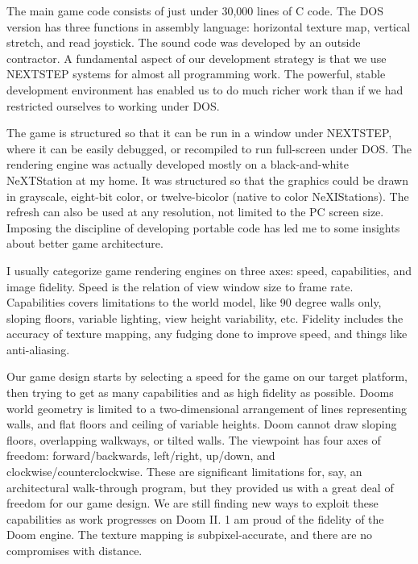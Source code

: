 The main game code consists of
just under 30,000
lines of C code. The
DOS version has three functions in assembly language: horizontal texture map, vertical stretch, and read
joystick. The sound code was developed by an outside contractor. A fundamental aspect of our development
strategy is that we use NEXTSTEP systems
for almost all programming
work. The powerful, stable development environment has enabled us to
do much richer work than if we had restricted ourselves to working under DOS.\\
\par
The game is structured so that it can be run in a window under NEXTSTEP, where it can be easily debugged, or recompiled to run full-screen under DOS. The rendering engine was actually developed mostly on a black-and-white NeXTStation at my home. It was structured so that the graphics could be drawn in grayscale, eight-bit color, or twelve-bicolor (native to color NeXIStations). The refresh can also be used at any resolution, not limited to the PC screen size. Imposing the discipline of developing portable code has led me to some insights about better game architecture.\\
\par

I usually categorize game rendering engines on three axes: speed, capabilities, and image fidelity. Speed is the relation of view window size to frame rate. Capabilities covers limitations to the world model, like 90 degree walls only, sloping floors, variable lighting, view height variability, etc. Fidelity includes the accuracy of texture mapping, any fudging done to improve speed, and things like anti-aliasing.\\
\par

Our game design starts by selecting a speed for the game on our target platform, then trying to get as many capabilities and as high fidelity as possible. Dooms world geometry is limited to a two-dimensional arrangement of lines representing walls, and flat floors and ceiling of variable heights. Doom cannot draw sloping floors, overlapping walkways, or tilted walls. The viewpoint has four axes of freedom: forward/backwards, left/right, up/down, and clockwise/counterclockwise. These are significant limitations for, say, an architectural walk-through program, but they provided us with a great deal of freedom for our game design. We are still finding new ways to exploit these capabilities as work progresses on Doom II. 1 am proud of the fidelity of the Doom engine. The texture mapping is subpixel-accurate, and there are no compromises with distance.\\
\par

